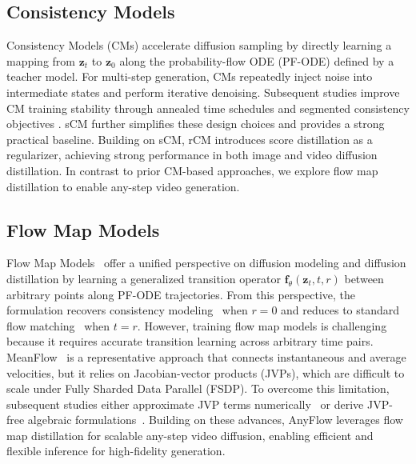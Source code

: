 \documentclass{llmxive}
\begin{document}
\subsection{Consistency Models}
Consistency Models (CMs) \cite{song2023consistency} accelerate diffusion sampling by directly learning a mapping from $\mathbf{z}_t$ to $\mathbf{z}_0$ along the probability-flow ODE (PF-ODE) defined by a teacher model. For multi-step generation, CMs repeatedly inject noise into intermediate states and perform iterative denoising. Subsequent studies improve CM training stability through annealed time schedules \cite{song2024improved, geng2024consistency} and segmented consistency objectives \cite{wang2024phased, ren2024hyper, lee2024truncated}. sCM \cite{lu2024simplifying} further simplifies these design choices and provides a strong practical baseline. Building on sCM, rCM \cite{zheng2025large} introduces score distillation as a regularizer, achieving strong performance in both image and video diffusion distillation. In contrast to prior CM-based approaches, we explore flow map distillation to enable any-step video generation.


\subsection{Flow Map Models}
Flow Map Models~\cite{boffi2024flow, sabour2025align, kim2024consistency} offer a unified perspective on diffusion modeling and diffusion distillation by learning a generalized transition operator $\mathbf{f}_\theta(\mathbf{z}_t, t, r)$ between arbitrary points along PF-ODE trajectories. From this perspective, the formulation recovers consistency modeling~\cite{song2023consistency} when $r=0$ and reduces to standard flow matching~\cite{liu2022flow, lipman2022flow} when $t=r$. However, training flow map models is challenging because it requires accurate transition learning across arbitrary time pairs. MeanFlow~\cite{geng2025mean} is a representative approach that connects instantaneous and average velocities, but it relies on Jacobian-vector products (JVPs), which are difficult to scale under Fully Sharded Data Parallel (FSDP). To overcome this limitation, subsequent studies either approximate JVP terms numerically~\cite{wang2025transition} or derive JVP-free algebraic formulations~\cite{luo2025soflow, guo2025splitmeanflow}. Building on these advances, AnyFlow leverages flow map distillation for scalable any-step video diffusion, enabling efficient and flexible inference for high-fidelity generation.
\end{document}
